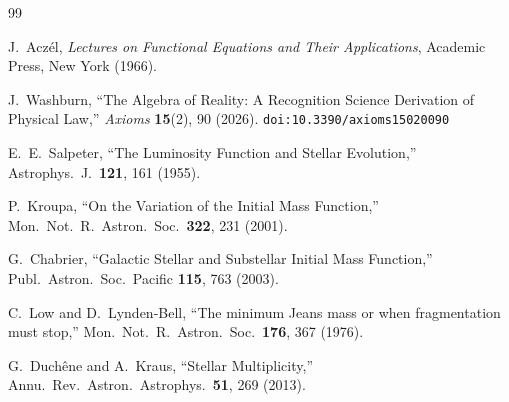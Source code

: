 \documentclass[12pt,a4paper]{article}
\theoremstyle{definition}
\theoremstyle{remark}
\begin{document}
\begin{thebibliography}{99}

J.~Acz\'el, \emph{Lectures on Functional Equations and Their Applications},
Academic Press, New York (1966).

J.~Washburn, ``The Algebra of Reality: A Recognition Science Derivation
of Physical Law,'' \emph{Axioms} \textbf{15}(2), 90 (2026).
\texttt{doi:10.3390/axioms15020090}

E.~E.~Salpeter, ``The Luminosity Function and Stellar Evolution,''
Astrophys.\ J.\ \textbf{121}, 161 (1955).

P.~Kroupa, ``On the Variation of the Initial Mass Function,'' Mon.\
Not.\ R.\ Astron.\ Soc.\ \textbf{322}, 231 (2001).

G.~Chabrier, ``Galactic Stellar and Substellar Initial Mass
Function,'' Publ.\ Astron.\ Soc.\ Pacific \textbf{115}, 763 (2003).

C.~Low and D.~Lynden-Bell, ``The minimum Jeans mass or when
fragmentation must stop,'' Mon.\ Not.\ R.\ Astron.\ Soc.\
\textbf{176}, 367 (1976).

G.~Duch\^{e}ne and A.~Kraus, ``Stellar Multiplicity,''
Annu.\ Rev.\ Astron.\ Astrophys.\ \textbf{51}, 269 (2013).

\end{thebibliography}
\end{document}
